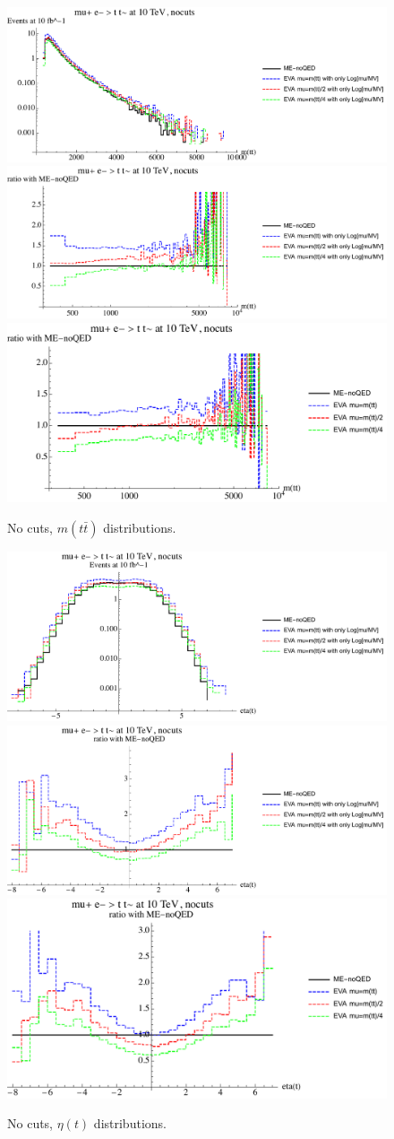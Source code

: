 \documentclass[a4paper,11pt]{article}
\begin{document}
\begin{figure}[!t]
\includegraphics[width=0.46\linewidth]{Notebooks/PlotDistr/ZZ_tt/10TeVnocuts/plotmtt.pdf}
\includegraphics[width=0.46\linewidth]{Notebooks/PlotDistr/ZZ_tt/10TeVnocuts/plotmttratio1.pdf}
\includegraphics[width=0.46\linewidth]{Notebooks/PlotDistr/ZZ_tt/10TeVnocuts/plotmttratio2.pdf}
\caption{No cuts, $m(t \bar t)$ distributions. \label{fig:nocutsZZtt}}
\end{figure}



\begin{figure}[!t]
\includegraphics[width=0.46\linewidth]{Notebooks/PlotDistr/ZZ_tt/10TeVnocuts/plotetat.pdf}
\includegraphics[width=0.46\linewidth]{Notebooks/PlotDistr/ZZ_tt/10TeVnocuts/plotetatratio1.pdf}
\includegraphics[width=0.46\linewidth]{Notebooks/PlotDistr/ZZ_tt/10TeVnocuts/plotetatratio2.pdf}
\caption{No cuts, $\eta(t)$ distributions. \label{fig:nocutsZZtt2}}
\end{figure}
\end{document}
